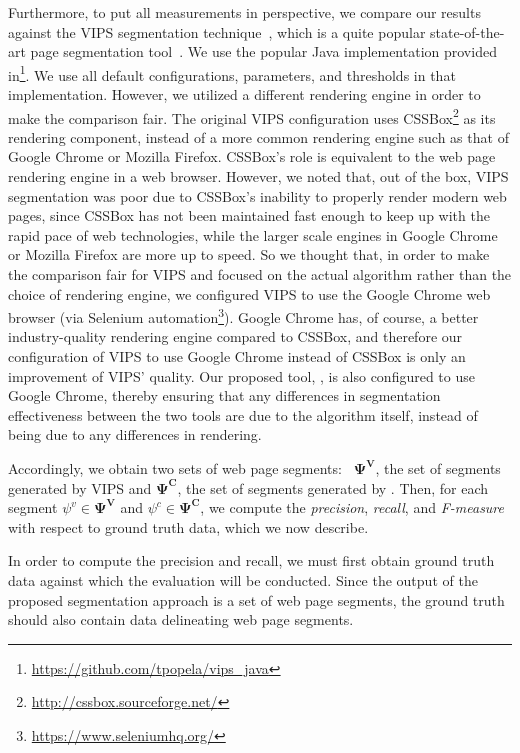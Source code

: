 Furthermore, to put all measurements in perspective,
we compare our results against
the VIPS segmentation technique~\cite{cai2003vips},
which is a quite popular state-of-the-art page segmentation tool~\cite{sleiman2013survey, campus2011web}.
We use the popular Java implementation provided in\footnote{\url{https://github.com/tpopela/vips_java}}.
We use all default configurations, parameters, and thresholds in that implementation.
However, we utilized a different rendering engine in order to make the comparison fair.
The original VIPS configuration uses CSSBox\footnote{\url{http://cssbox.sourceforge.net/}}
as its rendering component, instead of a more common rendering engine such as that of Google Chrome or Mozilla Firefox.
CSSBox's role is equivalent to the web page rendering engine in a web browser.
However, we noted that, out of the box, 
VIPS segmentation was poor due to CSSBox's
inability to properly render modern web pages,
since CSSBox has not been maintained fast enough to keep up with the rapid pace of web technologies,
while the larger scale engines in Google Chrome or Mozilla Firefox are more up to speed.
So we thought that, in order to make the comparison fair for VIPS 
and focused on the actual algorithm rather
than the choice of rendering engine,
we configured VIPS to use the Google Chrome web browser
(via Selenium automation\footnote{\url{https://www.seleniumhq.org/}}).
Google Chrome has, of course, a better industry-quality
rendering engine compared to CSSBox, and therefore our configuration
of VIPS to use Google Chrome instead of CSSBox
is only an improvement of VIPS' quality.
Our proposed tool, \toolname, is also configured to use Google Chrome,
thereby ensuring that any differences in segmentation effectiveness
between the two tools are due to the algorithm itself,
instead of being due to any differences in rendering.


Accordingly, we obtain two sets of web page segments:
~$\mathbf{\Psi^V}$, the set of segments generated by VIPS
and $\mathbf{\Psi^C}$, the set of segments generated by \toolname.
Then, for each segment $\psi^v \in \mathbf{\Psi^V}$ and $\psi^c \in \mathbf{\Psi^C}$,
we compute the \emph{precision}, \emph{recall},
and \emph{F-measure} with respect to ground truth data,
which we now describe.

In order to compute the precision and recall, we must first obtain
ground truth data against which the evaluation will be conducted.
Since the output of the proposed segmentation approach is a set of 
web page segments, the ground truth should also contain data 
delineating web page segments.

